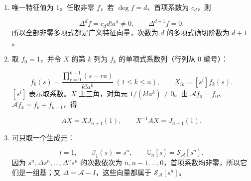 \documentclass[UTF8,10pt,letterpaper,fontset=fandol]{ctexart}
\newcommand{\C}{\mathbb C}
\begin{document}
\begin{enumerate}
\item 唯一特征值为 $1$。任取非零 $f$，若 $\deg f=d$、首项系数为 $c_d$，则

\[
\Delta^d f=c_d d!a^d\ne0,\qquad\Delta^{d+1}f=0.
\]
所以全部非零多项式都是广义特征向量，次数为 $d$ 的多项式确切阶数为 $d+1$。

\item 取 $f_0=1$，并令 $X$ 的第 $k$ 列为 $f_k$ 的单项式系数列（行列从 $0$ 编号）：

\[
f_k(s)=\frac{\prod_{r=0}^{k-1}(s-ra)}{k!a^k}\ (1\le k\le n),\qquad\boxed{X_{ik}=[s^i]f_k(s)}.
\]
$[s^i]$ 表示取系数。$X$ 上三角，对角元 $1/(k!a^k)\ne0$。由 $\mathcal A f_0=f_0$、$\mathcal A f_k=f_k+f_{k-1}$，得

\[
\boxed{AX=XJ_{n+1}(1),\qquad X^{-1}AX=J_{n+1}(1)}.
\]

\item 可只取一个生成元：

\[
\boxed{l=1,\qquad\beta_1(s)=s^n,\qquad\C_n[s]=\mathcal S_{\mathcal A}[s^n]}.
\]
因为 $s^n,\Delta s^n,\ldots,\Delta^ns^n$ 的次数依次为 $n,n-1,\ldots,0$，首项系数均非零，所以它们是一组基；又 $\Delta=\mathcal A-I$，这些向量都属于 $\mathcal S_{\mathcal A}[s^n]$。

\end{enumerate}
\end{document}
